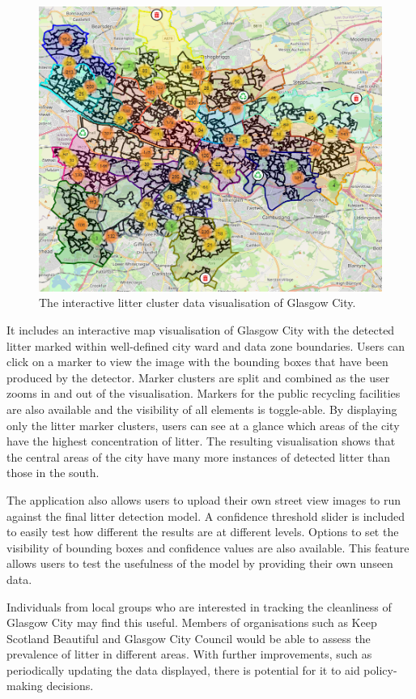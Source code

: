 \documentclass{thesis}
\begin{document}
\begin{figure}[h]
    \centering
    \includegraphics[scale=0.40]{images/glasgow-city.PNG}
    \caption{The interactive litter cluster data visualisation of Glasgow City.}
\end{figure}

It includes an interactive map visualisation of Glasgow City with the detected litter marked within well-defined city ward and data zone boundaries. Users can click on a marker to view the image with the bounding boxes that have been produced by the detector. Marker clusters are split and combined as the user zooms in and out of the visualisation. Markers for the public recycling facilities are also available and the visibility of all elements is toggle-able. By displaying only the litter marker clusters, users can see at a glance which areas of the city have the highest concentration of litter. The resulting visualisation shows that the central areas of the city have many more instances of detected litter than those in the south.

The application also allows users to upload their own street view images to run against the final litter detection model. A confidence threshold slider is included to easily test how different the results are at different levels. Options to set the visibility of bounding boxes and confidence values are also available. This feature allows users to test the usefulness of the model by providing their own unseen data.

Individuals from local groups who are interested in tracking the cleanliness of Glasgow City may find this useful. Members of organisations such as Keep Scotland Beautiful and Glasgow City Council would be able to assess the prevalence of litter in different areas. With further improvements, such as periodically updating the data displayed, there is potential for it to aid policy-making decisions.
\end{document}
